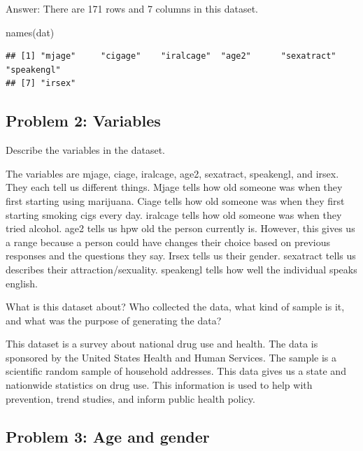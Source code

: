 \documentclass[
]{article}
\newenvironment{Shaded}{\begin{snugshade}}{\end{snugshade}}
\newcommand{\FunctionTok}[1]{\textcolor[rgb]{0.00,0.00,0.00}{#1}}
\newcommand{\NormalTok}[1]{#1}
\begin{document}
Answer: There are 171 rows and 7 columns in this dataset.

\begin{Shaded}
\begin{Highlighting}[]
\FunctionTok{names}\NormalTok{(dat)}
\end{Highlighting}
\end{Shaded}

\begin{verbatim}
## [1] "mjage"     "cigage"    "iralcage"  "age2"      "sexatract" "speakengl"
## [7] "irsex"
\end{verbatim}

\hypertarget{problem-2-variables}{%
\subsection{Problem 2: Variables}\label{problem-2-variables}}

Describe the variables in the dataset.

The variables are mjage, ciage, iralcage, age2, sexatract, speakengl,
and irsex. They each tell us different things. Mjage tells how old
someone was when they first starting using marijuana. Ciage tells how
old someone was when they first starting smoking cigs every day.
iralcage tells how old someone was when they tried alcohol. age2 tells
us hpw old the person currently is. However, this gives us a range
because a person could have changes their choice based on previous
responses and the questions they say. Irsex tells us their gender.
sexatract tells us describes their attraction/sexuality. speakengl tells
how well the individual speaks english.

What is this dataset about? Who collected the data, what kind of sample
is it, and what was the purpose of generating the data?

This dataset is a survey about national drug use and health. The data is
sponsored by the United States Health and Human Services. The sample is
a scientific random sample of household addresses. This data gives us a
state and nationwide statistics on drug use. This information is used to
help with prevention, trend studies, and inform public health policy.

\hypertarget{problem-3-age-and-gender}{%
\subsection{Problem 3: Age and gender}\label{problem-3-age-and-gender}}
\end{document}
